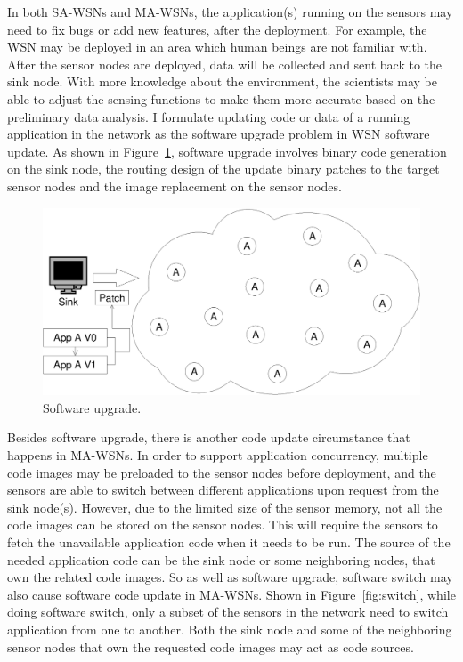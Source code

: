 In both SA-WSNs and MA-WSNs, the application(s) running on the sensors may need to fix bugs or add new features, after the deployment. For example, the WSN may be deployed in an area which human beings are not familiar with. After the sensor nodes are deployed, data will be collected and sent back to the sink node. With more knowledge about the environment, the scientists may be able to adjust the sensing functions to make them more accurate based on the preliminary data analysis. I formulate updating code or data of a running application in the network as the software upgrade problem in WSN software update. As shown in Figure~\ref{fig:upgrade}, software upgrade involves binary code generation on the sink node, the routing design of the update binary patches to the target sensor nodes and the image replacement on the sensor nodes.

\begin{figure}[htbp]
	\centering
		\includegraphics[scale=0.35]{figures/upgrade.eps}
	\caption{Software upgrade.}
	\label{fig:upgrade}
\end{figure}

Besides software upgrade, there is another code update circumstance that happens in MA-WSNs.
In order to support application concurrency, multiple code images may be preloaded to the sensor nodes before deployment, and the sensors are able to switch between different applications upon request from the sink node(s). However, due to the limited size of the sensor memory, not all the code images can be stored on the sensor nodes. This will require the sensors to fetch the unavailable application code when it needs to be run. The source of the needed application code can be the sink node or some neighboring nodes, that own the related code images. So as well as software upgrade, software switch may also cause software code update in MA-WSNs. Shown in Figure~\ref{fig:switch}, while doing software switch, only a subset of the sensors in the network need to switch application from one to another. Both the sink node and some of the neighboring sensor nodes that own the requested code images may act as code sources.

